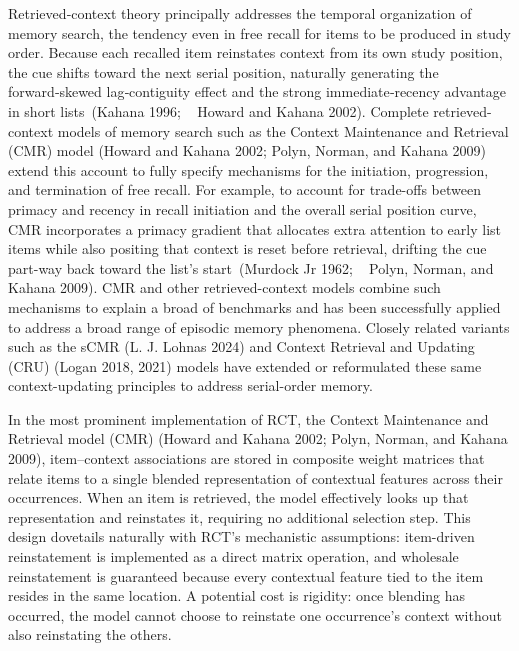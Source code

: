 \documentclass[
  letterpaper,
  11pt,
  english,
  singlespacing,
  headsepline]{MastersDoctoralThesis}
\begin{document}
Retrieved‑context theory principally addresses the temporal organization
of memory search, the tendency even in free recall for items to be
produced in study order. Because each recalled item reinstates context
from its own study position, the cue shifts toward the next serial
position, naturally generating the forward‑skewed lag‑contiguity effect
and the strong immediate‑recency advantage in short lists~(Kahana 1996;
~ Howard and Kahana 2002). Complete retrieved-context models of memory
search such as the Context Maintenance and Retrieval (CMR) model (Howard
and Kahana 2002; Polyn, Norman, and Kahana 2009) extend this account to
fully specify mechanisms for the initiation, progression, and
termination of free recall. For example, to account for trade-offs
between primacy and recency in recall initiation and the overall serial
position curve, CMR incorporates a primacy gradient that allocates extra
attention to early list items while also positing that context is reset
before retrieval, drifting the cue part-way back toward the list's
start~(Murdock Jr 1962; ~ Polyn, Norman, and Kahana 2009). CMR and other
retrieved-context models combine such mechanisms to explain a broad of
benchmarks and has been successfully applied to address a broad range of
episodic memory phenomena. Closely related variants such as the sCMR (L.
J. Lohnas 2024) and Context Retrieval and Updating (CRU) (Logan 2018,
2021) models have extended or reformulated these same context-updating
principles to address serial-order memory.

In the most prominent implementation of RCT, the Context Maintenance and
Retrieval model (CMR) (Howard and Kahana 2002; Polyn, Norman, and Kahana
2009), item--context associations are stored in composite weight
matrices that relate items to a single blended representation of
contextual features across their occurrences. When an item is retrieved,
the model effectively looks up that representation and reinstates it,
requiring no additional selection step. This design dovetails naturally
with RCT's mechanistic assumptions: item-driven reinstatement is
implemented as a direct matrix operation, and wholesale reinstatement is
guaranteed because every contextual feature tied to the item resides in
the same location. A potential cost is rigidity: once blending has
occurred, the model cannot choose to reinstate one occurrence's context
without also reinstating the others.
\end{document}
